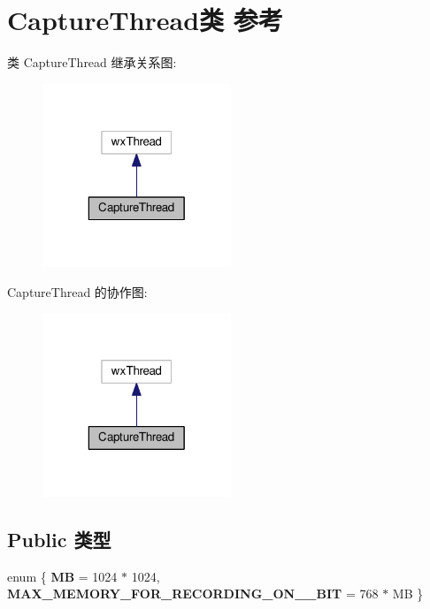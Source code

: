 \hypertarget{class_capture_thread}{\section{Capture\+Thread类 参考}
\label{class_capture_thread}
}


类 Capture\+Thread 继承关系图\+:
\nopagebreak
\begin{figure}[H]
\begin{center}
\leavevmode
\includegraphics[width=160pt]{class_capture_thread__inherit__graph}
\end{center}
\end{figure}


Capture\+Thread 的协作图\+:
\nopagebreak
\begin{figure}[H]
\begin{center}
\leavevmode
\includegraphics[width=160pt]{class_capture_thread__coll__graph}
\end{center}
\end{figure}
\subsection*{Public 类型}
\begin{DoxyCompactItemize}
\item 
\hypertarget{class_capture_thread_a1e78fe40e3015c6f38cbbd79ff943c5a}{enum \{ {\bfseries M\+B} = 1024 $\ast$ 1024, 
{\bfseries M\+A\+X\+\_\+\+M\+E\+M\+O\+R\+Y\+\_\+\+F\+O\+R\+\_\+\+R\+E\+C\+O\+R\+D\+I\+N\+G\+\_\+\+O\+N\+\_\+\_\+\+B\+I\+T} = 768 $\ast$ M\+B
 \}}\label{class_capture_thread_a1e78fe40e3015c6f38cbbd79ff943c5a}

\end{DoxyCompactItemize}
